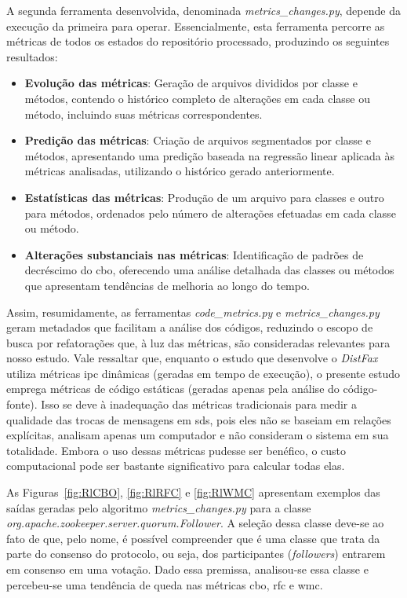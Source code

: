 A segunda ferramenta desenvolvida, denominada \textit{metrics\_changes.py}\cite{PyDriller:MetricsChanges:2023},  depende da execução da primeira para operar. Essencialmente, esta ferramenta percorre as métricas de todos os estados do repositório processado, produzindo os seguintes resultados:

\begin{itemize}
    \item \textbf{Evolução das métricas}: Geração de arquivos divididos por classe e métodos, contendo o histórico completo de alterações em cada classe ou método, incluindo suas métricas correspondentes.
    \item \textbf{Predição das métricas}: Criação de arquivos segmentados por classe e métodos, apresentando uma predição baseada na regressão linear aplicada às métricas analisadas, utilizando o histórico gerado anteriormente.
    \item \textbf{Estatísticas das métricas}: Produção de um arquivo para classes e outro para métodos, ordenados pelo número de alterações efetuadas em cada classe ou método.
    \item \textbf{Alterações substanciais nas métricas}: Identificação de padrões de decréscimo do \gls{cbo}, oferecendo uma análise detalhada das classes ou métodos que apresentam tendências de melhoria ao longo do tempo.
\end{itemize}

Assim, resumidamente, as ferramentas \textit{code\_metrics.py} e \textit{metrics\_changes.py} geram metadados que facilitam a análise dos códigos, reduzindo o escopo de busca por refatorações que, à luz das métricas, são consideradas relevantes para nosso estudo. Vale ressaltar que, enquanto o estudo que desenvolve o \textit{DistFax}\cite{DistFax} utiliza métricas \gls{ipc} dinâmicas (geradas em tempo de execução), o presente estudo emprega métricas de código estáticas (geradas apenas pela análise do código-fonte). Isso se deve à inadequação das métricas tradicionais para medir a qualidade das trocas de mensagens em \gls{sds}, pois eles não se baseiam em relações explícitas, analisam apenas um computador e não consideram o sistema em sua totalidade. Embora o uso dessas métricas pudesse ser benéfico, o custo computacional pode ser bastante significativo para calcular todas elas.

As Figuras~\ref{fig:RlCBO}, \ref{fig:RlRFC} e \ref{fig:RlWMC} apresentam exemplos das saídas geradas pelo algoritmo \textit{metrics\_changes.py} para a classe \textit{org.apache.zookeeper.server.quorum.Follower}. A seleção dessa classe deve-se ao fato de que, pelo nome, é possível compreender que é uma classe que trata da parte do consenso do protocolo, ou seja, dos participantes (\textit{followers}) entrarem em consenso em uma votação. Dado essa premissa, analisou-se essa classe e percebeu-se uma tendência de queda nas métricas \gls{cbo}, \gls{rfc} e \gls{wmc}.

